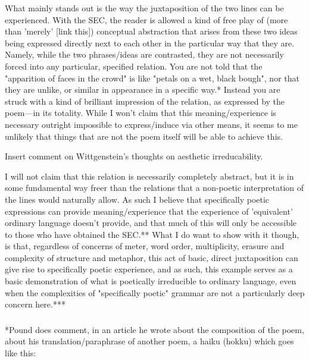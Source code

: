 \documentclass[]{article}
\begin{document}
What mainly stands out is the way the juxtaposition of the two lines can be experienced. With the SEC, the reader is allowed a kind of free play of (more than 'merely' [link this]) conceptual abstraction that arises from these two ideas being expressed directly next to each other in the particular way that they are. Namely, while the two phrases/ideas are contrasted, they are not necessarily forced into any particular, specified relation. You are not told that the "apparition of faces in the crowd" is like "petals on a wet, black bough", nor that they are unlike, or similar in appearance in a specific way.* Instead you are struck with a kind of brilliant impression of the relation, as expressed by the poem—in its totality. While I won't claim that this meaning/experience is necessary outright impossible to express/induce via other means, it seems to me unlikely that things that are not the poem itself will be able to achieve this.

Insert comment on Wittgenstein's thoughts on aesthetic irreducability.



I will not claim that this relation is necessarily completely abstract, but it is in some fundamental way freer than the relations that a non-poetic interpretation of the lines would naturally allow. As such I believe that specifically poetic expressions can provide meaning/experience that the experience of 'equivalent' ordinary language doesn't provide, and that much of this will only be accessible to those who have obtained the SEC.** What I do want to show with it though, is that, regardless of concerns of meter, word order, multiplicity, erasure and complexity of structure and metaphor, this act of basic, direct juxtaposition can give rise to specifically poetic experience, and as such, this example serves as a basic demonstration of what is poetically irreducible to ordinary language, even when the complexities of "specifically poetic" grammar are not a particularly deep concern here.***



\subsubsection{}



*Pound does comment, in an article he wrote about the composition of the poem, about his translation/paraphrase of another poem, a haiku (hokku) which goes like this:
\end{document}
